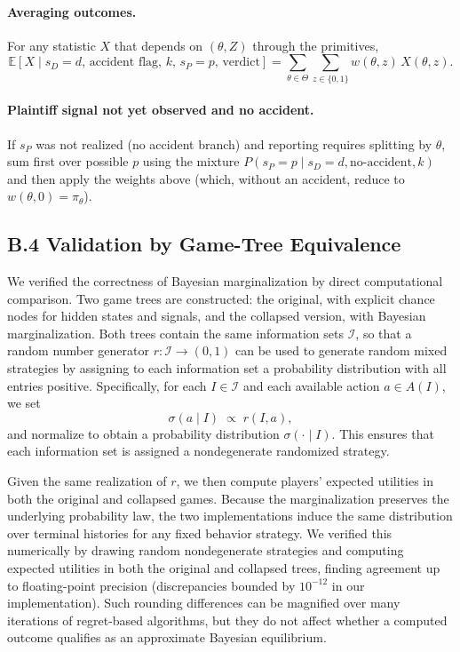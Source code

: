 \documentclass{article}
\begin{document}
\paragraph{Averaging outcomes.}
For any statistic $X$ that depends on $(\theta,Z)$ through the primitives,
\[
\mathbb{E}\!\left[X \mid s_D=d,\,\text{accident flag},\,k,\,s_P=p,\,\text{verdict}\right]
=\sum_{\theta\in\Theta}\sum_{z\in\{0,1\}} w(\theta,z)\,X(\theta,z).
\]

\paragraph{Plaintiff signal not yet observed and no accident.}
If $s_P$ was not realized (no accident branch) and reporting requires splitting by $\theta$, sum first over possible $p$ using the mixture $P(s_P=p\mid s_D=d,\text{no-accident},k)$ and then apply the weights above (which, without an accident, reduce to $w(\theta,0)=\pi_\theta$).



\subsection*{B.4 Validation by Game-Tree Equivalence}

We verified the correctness of Bayesian marginalization by direct computational comparison. Two game trees are constructed: the original, with explicit chance nodes for hidden states and signals, and the collapsed version, with Bayesian marginalization. Both trees contain the same information sets $\mathcal{I}$, so that a random number generator $r:\mathcal{I}\to(0,1)$ can be used to generate random mixed strategies by assigning to each information set a probability distribution with all entries positive. Specifically, for each $I\in \mathcal{I}$ and each available action $a\in A(I)$, we set
\[
\sigma(a\mid I) \;\propto\; r(I,a),
\]
and normalize to obtain a probability distribution $\sigma(\cdot\mid I)$. This ensures that each information set is assigned a nondegenerate randomized strategy.

Given the same realization of $r$, we then compute players’ expected utilities in both the original and collapsed games. Because the marginalization preserves the underlying probability law, the two implementations induce the same distribution over terminal histories for any fixed behavior strategy. We verified this numerically by drawing random nondegenerate strategies and computing expected utilities in both the original and collapsed trees, finding agreement up to floating-point precision (discrepancies bounded by $10^{-12}$ in our implementation). Such rounding differences can be magnified over many iterations of regret-based algorithms, but they do not affect whether a computed outcome qualifies as an approximate Bayesian equilibrium.
\end{document}
